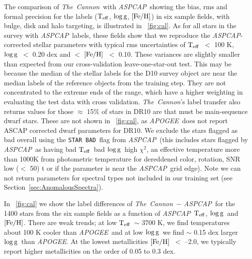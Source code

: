 \documentclass[12pt, preprint]{aastex}
\newcommand{\sectionname}{Section}
\newcommand{\tc}{\textsl{The~Cannon}}
\newcommand{\apogee}{\textsl{APOGEE}}
\newcommand{\aspcap}{\textsl{ASPCAP}}
\newcommand{\badstar}{\texttt{STAR BAD}}
\newcommand{\teff}{\mbox{$\rm T_{eff}$}}
\newcommand{\feh}{\mbox{$\rm [Fe/H]$}}
\newcommand{\logg}{\mbox{$\rm \log g$}}
\begin{document}
The comparison of \tc\ with \aspcap\, showing the bias, rms and formal precision for the labels (\teff , \logg , \feh ) in six sample fields, with bulge, disk and halo targeting, is illustrated in \figurename~\ref{fig:cal}. As for all stars in the survey with \aspcap\ labels, these fields show that we reproduce the \aspcap-corrected stellar parameters with typical rms uncertainties of \teff\ $<$ 100 K, \logg\ $<$ 0.20 dex and $<$ \feh\ $<$ 0.10. These variances are slightly smaller than expected from our cross-validation leave-one-star-out test. This may be because the median of the stellar labels for the D10 survey object are near the median labels of the reference objects from the training step. 
They are not concentrated to the extreme ends of the range, which have a higher weighting in evaluating the test data with cross validation. 
 \tc 's label transfer also returns values for those $\approx$ 15\% of stars in DR10 are that must be main-sequence dwarf stars. 
These are not shown in \figurename~\ref{fig:cal}, as \apogee\ does not report ASCAP corrected dwarf parameters for DR10. 
We exclude the stars flagged as bad overall  using the \badstar\ flag from \aspcap\ (this includes stars flagged by \aspcap\ as having bad \teff\, bad \logg\, high $\chi^2$, an effective temperature more than 1000K from photometric temperature for dereddened color, rotation, SNR low ($<$ 50) t or if the parameter is near the \aspcap\ grid edge).  Note we can not return parameters for spectral types not included in our training set (see \sectionname~\ref{sec:AnomalousSpectra}). 

In \figurename~\ref{fig:cal} we show the label differences of \tc\ $-$ \aspcap\ for the 1400 stars from the six sample fields as a function of \aspcap\ \teff, \logg\ and \feh. There are weak trends; at low \teff\ $\sim$ 3700 K, we find temperatures about 100 K cooler than \apogee\ and at low \logg\ we find $\sim$ 0.15 dex larger \logg\ than \apogee. At the lowest metallicities \feh\ $<$ --2.0, we typically report higher metallicities on the order of 0.05 to 0.3 dex.
\end{document}
